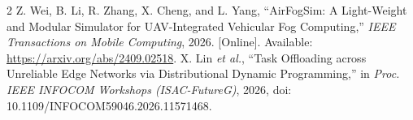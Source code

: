 \documentclass[journal]{IEEEtran}
\begin{document}
\begin{thebibliography}{2}
 Z. Wei, B. Li, R. Zhang, X. Cheng, and L. Yang, ``AirFogSim: A Light-Weight and Modular Simulator for UAV-Integrated Vehicular Fog Computing,'' \emph{IEEE Transactions on Mobile Computing}, 2026. [Online]. Available: \url{https://arxiv.org/abs/2409.02518}.
 X. Lin \emph{et al.}, ``Task Offloading across Unreliable Edge Networks via Distributional Dynamic Programming,'' in \emph{Proc. IEEE INFOCOM Workshops (ISAC-FutureG)}, 2026, doi: 10.1109/INFOCOM59046.2026.11571468.
\end{thebibliography}
\end{document}
